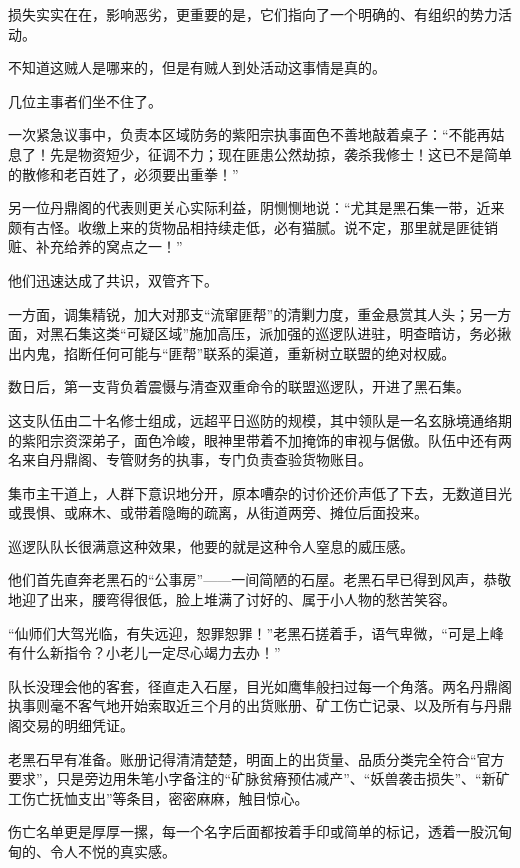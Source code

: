 损失实实在在，影响恶劣，更重要的是，它们指向了一个明确的、有组织的势力活动。

不知道这贼人是哪来的，但是有贼人到处活动这事情是真的。

几位主事者们坐不住了。

一次紧急议事中，负责本区域防务的紫阳宗执事面色不善地敲着桌子：“不能再姑息了！先是物资短少，征调不力；现在匪患公然劫掠，袭杀我修士！这已不是简单的散修和老百姓了，必须要出重拳！”

另一位丹鼎阁的代表则更关心实际利益，阴恻恻地说：“尤其是黑石集一带，近来颇有古怪。收缴上来的货物品相持续走低，必有猫腻。说不定，那里就是匪徒销赃、补充给养的窝点之一！”

他们迅速达成了共识，双管齐下。

一方面，调集精锐，加大对那支“流窜匪帮”的清剿力度，重金悬赏其人头；另一方面，对黑石集这类“可疑区域”施加高压，派加强的巡逻队进驻，明查暗访，务必揪出内鬼，掐断任何可能与“匪帮”联系的渠道，重新树立联盟的绝对权威。

\vspace{2em}

数日后，第一支背负着震慑与清查双重命令的联盟巡逻队，开进了黑石集。

这支队伍由二十名修士组成，远超平日巡防的规模，其中领队是一名玄脉境通络期的紫阳宗资深弟子，面色冷峻，眼神里带着不加掩饰的审视与倨傲。队伍中还有两名来自丹鼎阁、专管财务的执事，专门负责查验货物账目。

集市主干道上，人群下意识地分开，原本嘈杂的讨价还价声低了下去，无数道目光或畏惧、或麻木、或带着隐晦的疏离，从街道两旁、摊位后面投来。

巡逻队队长很满意这种效果，他要的就是这种令人窒息的威压感。

他们首先直奔老黑石的“公事房”——一间简陋的石屋。老黑石早已得到风声，恭敬地迎了出来，腰弯得很低，脸上堆满了讨好的、属于小人物的愁苦笑容。

“仙师们大驾光临，有失远迎，恕罪恕罪！”老黑石搓着手，语气卑微，“可是上峰有什么新指令？小老儿一定尽心竭力去办！”

队长没理会他的客套，径直走入石屋，目光如鹰隼般扫过每一个角落。两名丹鼎阁执事则毫不客气地开始索取近三个月的出货账册、矿工伤亡记录、以及所有与丹鼎阁交易的明细凭证。

老黑石早有准备。账册记得清清楚楚，明面上的出货量、品质分类完全符合“官方要求”，只是旁边用朱笔小字备注的“矿脉贫瘠预估减产”、“妖兽袭击损失”、“新矿工伤亡抚恤支出”等条目，密密麻麻，触目惊心。

伤亡名单更是厚厚一摞，每一个名字后面都按着手印或简单的标记，透着一股沉甸甸的、令人不悦的真实感。

